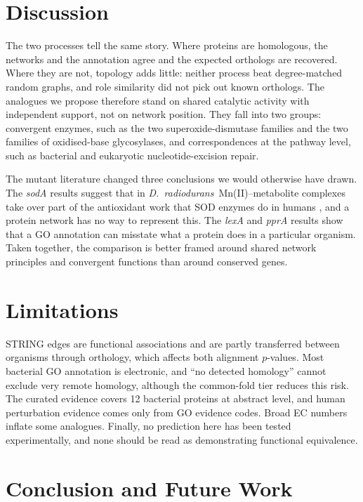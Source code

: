 \documentclass[conference]{IEEEtran}
\newcommand{\Dr}{\emph{D.~radiodurans}}
\newcommand{\gene}[1]{\textit{#1}}
\begin{document}
\section{Discussion}

The two processes tell the same story. Where proteins are homologous, the networks and the
annotation agree and the expected orthologs are recovered. Where they are not, topology adds
little: neither process beat degree-matched random graphs, and role similarity did not pick out
known orthologs. The analogues we propose therefore stand on shared catalytic activity with
independent support, not on network position. They fall into two groups: convergent enzymes, such
as the two superoxide-dismutase families and the two families of oxidised-base glycosylases, and
correspondences at the pathway level, such as bacterial and eukaryotic nucleotide-excision repair.

The mutant literature changed three conclusions we would otherwise have drawn. The \gene{sodA}
results suggest that in \Dr\ Mn(II)--metabolite complexes take over part of the antioxidant work
that SOD enzymes do in humans \cite{gaidamakova2022,daly2007}, and a protein network has no way to
represent this. The \gene{lexA} and \gene{pprA} results show that a GO annotation can misstate what
a protein does in a particular organism. Taken together, the comparison is better framed around
shared network principles and convergent functions than around conserved genes.

\section{Limitations}

STRING edges are functional associations and are partly transferred between organisms through
orthology, which affects both alignment $p$-values. Most bacterial GO annotation is electronic, and
``no detected homology'' cannot exclude very remote homology, although the common-fold tier reduces
this risk. The curated evidence covers 12 bacterial proteins at abstract level, and human
perturbation evidence comes only from GO evidence codes. Broad EC numbers inflate some analogues.
Finally, no prediction here has been tested experimentally, and none should be read as
demonstrating functional equivalence.

\section{Conclusion and Future Work}
\end{document}
